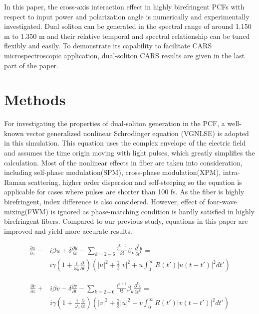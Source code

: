 \documentclass{osa-article}
\begin{document}
In this paper, the cross-axis interaction effect in highly birefringent PCFs with respect to input power and polarization angle is numerically and experimentally investigated. Dual soliton can be generated in the spectral range of around 1.150 \textmu m to 1.350 \textmu m and their relative temporal and spectral relationship can be tuned flexibly and easily. To demonstrate its capability to facilitate CARS microspectroscopic application, dual-soliton CARS results are given in the last part of the paper. 
\section{Methods}

For investigating the properties of dual-soliton generation in the PCF, a well-known vector generalized nonlinear Schrodinger equation (VGNLSE)\cite{husakou_supercontinuum_2001,agrawal_nonlinear_2013} is adopted in this simulation. This equation uses the complex envelope of the electric field and assumes the time origin moving with light pulses, which greatly simplifies the calculation. Most of the nonlinear effects in fiber are taken into consideration, including self-phase modulation(SPM), cross-phase modulation(XPM), intra-Raman scattering, higher order dispersion and self-steeping so the equation is applicable for cases where pulses are shorter than 100 fs\cite{agrawal_nonlinear_2013}. As the fiber is highly birefringent, index difference is also considered. However, effect of four-wave mixing(FWM) is ignored as phase-matching condition is hardly satisfied in highly birefringent fibers. Compared to our previous study\cite{chen_dual-soliton_2016}, equations in this paper are improved and yield more accurate results.  

\begin{equation}
\begin{split}
\frac{\partial u}{\partial z} - & i\beta u + \delta \frac{\partial u}{\partial t}-\sum_{k=2-6}\frac{i^{k+1}}{k!}\beta_k\frac{\partial^k u}{\partial t^k} =\\
 & i\gamma\left(1+\frac{i}{\omega_0}\frac{\partial}{\partial t}\right)\left(|u|^2+\frac{2}{3}|v|^2+u\int_0^\infty{R(t')|u(t-t')|^2dt'} \right)
\label{eq1}
\end{split}
\end{equation}


\begin{equation}
\begin{split}
\frac{\partial v}{\partial z} + & i\beta v - \delta \frac{\partial v}{\partial t}-\sum_{k=2-6}\frac{i^{k+1}}{k!}\beta_k\frac{\partial^k v}{\partial t^k} =\\
 & i\gamma\left(1+\frac{i}{\omega_0}\frac{\partial}{\partial t}\right)\left(|v|^2+\frac{2}{3}|u|^2+v\int_0^\infty{R(t')|v(t-t')|^2dt'} \right)
\label{eq2}
\end{split}
\end{equation}
\end{document}
